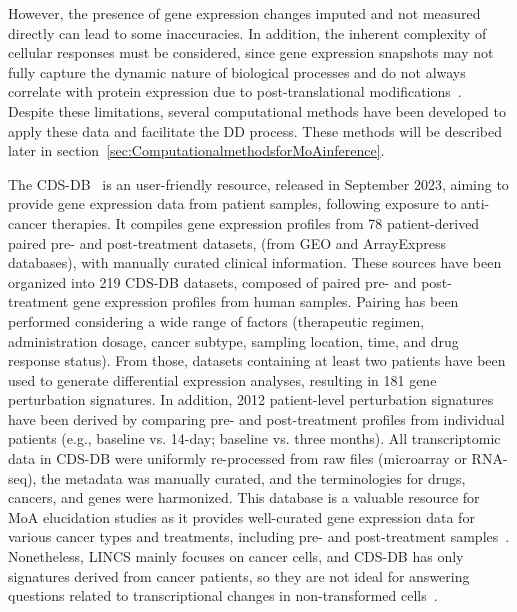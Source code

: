 However, the presence of gene expression changes imputed and not measured directly can lead to some inaccuracies. 
In addition, the inherent complexity of cellular responses must be considered, since gene expression snapshots may not fully capture the dynamic nature of biological processes and do not always correlate with protein expression due to post-translational modifications~\cite{RN38}. 
Despite these limitations, several computational methods have been developed to apply these data and facilitate the \gls{DD} process. 
These methods will be described later in section~\ref{sec:ComputationalmethodsforMoAinference}. 

The \gls{CDS-DB}~\cite{RN84} is an user-friendly resource, released in September 2023, aiming to provide gene expression data from patient samples, following exposure to anti-cancer therapies. 
It compiles gene expression profiles from 78 patient-derived paired pre- and post-treatment datasets, (from \gls{GEO} and ArrayExpress databases), with manually curated clinical information. 
These sources have been organized into 219 \gls{CDS-DB} datasets, composed of paired pre- and post-treatment gene expression profiles from human samples. 
Pairing has been performed considering a wide range of factors (therapeutic regimen, administration dosage, cancer subtype, sampling location, time, and drug response status). 
From those, datasets containing at least two patients have been used to generate differential expression analyses, resulting in 181 gene perturbation signatures. 
In addition, 2012 patient-level perturbation signatures have been derived by comparing pre- and post-treatment profiles from individual patients (e.g., baseline vs. 14-day; baseline vs. three months). 
All transcriptomic data in \gls{CDS-DB} were uniformly re-processed from raw files (microarray or \gls{RNA-seq}), the metadata was manually curated, and the terminologies for drugs, cancers, and genes were harmonized. 
This database is a valuable resource for \gls{MoA} elucidation studies as it provides well-curated gene expression data for various cancer types and treatments, including pre- and post-treatment samples~\cite{RN84}. 
Nonetheless, \gls{LINCS} mainly focuses on cancer cells, and \gls{CDS-DB} has only signatures derived from cancer patients, so they are not ideal for answering questions related to transcriptional changes in non-transformed cells~\cite{RN86}.

